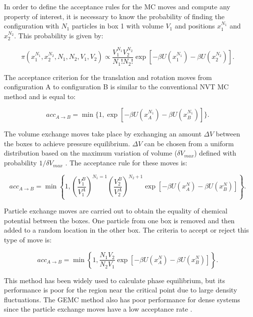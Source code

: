 In order to define the acceptance rules for the MC moves and compute any property of interest, it is necessary to know the probability of finding the configuration with $N_{1}$ particles in box 1 with volume $V_{1}$ and positions $x_{1}^{N_{1}}$ and $x_{2}^{N_{2}}$. This probability is given by:

\begin{equation}
\pi(x_{1}^{N_{1}},x_{2}^{N_{2}},N_{1},N_{2},V_{1},V_{2}) \propto \dfrac{V_{1}^{N_{1}}V_{2}^{N_{2}}}{N_{1}!N_{2}!} \exp[-\beta U(x_{1}^{N_{1}}) -\beta U(x_{2}^{N_{2}})] .
\label{eqn:geprob}
\end{equation}

The acceptance criterion for the translation and rotation moves from configuration A    to configuration B is similar to the conventional NVT MC method and is equal to:

\begin{equation}
acc_{A \rightarrow B} = \min \lbrace 1,\exp[-\beta U(x_{A}^{N_{1}}) -\beta U(x_{B}^{N_{1}})] \rbrace .
\label{eqn:drprob}
\end{equation} 

The volume exchange moves take place by exchanging an amount $\Delta V$ between the boxes to achieve pressure equilibrium. $\Delta V$ can be chosen from a uniform distribution based on the maximum variation of volume ($\delta V_{max}$) defined with probability $1/\delta V_{max}$ \cite{frenkel}. The acceptance rule for these moves is: 

\begin{equation}
acc_{A \rightarrow B} = \min \left \lbrace 1, \left(\dfrac{V_{1}^{B}}{V_{1}^{A}} \right)^{N_{1}=1} \left( \dfrac{V_{2}^{B}}{V_{2}^{A}} \right)^{N_{2}+1} \exp[-\beta U(x_{A}^{N}) -\beta U(x_{B}^{N})] \right \rbrace .
\label{vprob}
\end{equation}

Particle exchange moves are carried out to obtain the equality of chemical potential between the boxes. One particle from one box is removed and then added to a random location in the other box. The criteria to accept or reject this type of move is:

\begin{equation}
acc_{A \rightarrow B} = \min \left \lbrace 1, \dfrac{N_{1}V_{2}}{N_{2}V_{1}}  \exp[-\beta U(x_{A}^{N}) -\beta U(x_{B}^{N})] \right \rbrace .
\label{moleprob}
\end{equation}

This method has been widely used to calculate phase equilibrium, but its performance is poor for the region near the critical point due to large density fluctuations. The GEMC method also has poor performance for dense systems since the particle exchange moves have a low acceptance rate \cite{978-94-017-0765-7}.  





